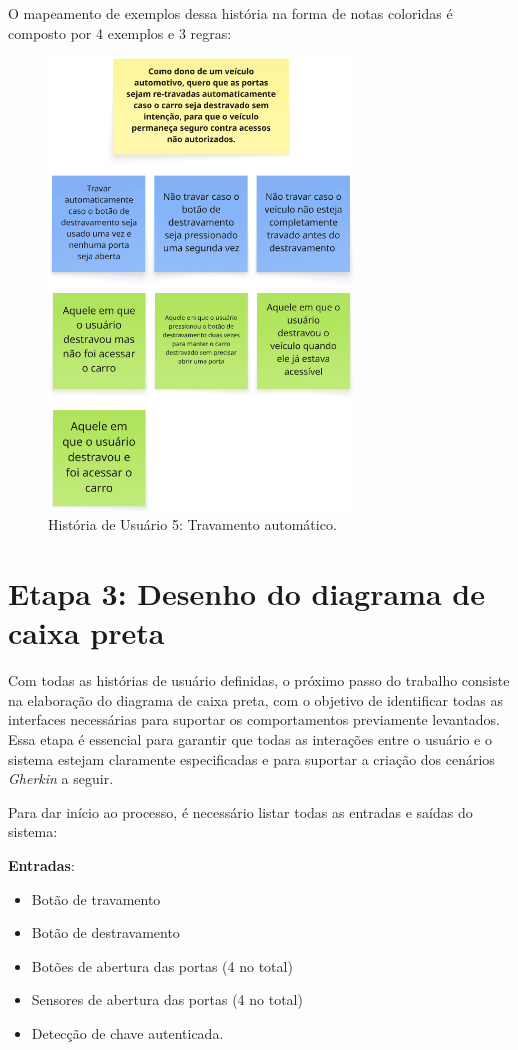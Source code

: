 O mapeamento de exemplos dessa história na forma de notas coloridas é composto por 4 exemplos e 3 regras:

\begin{figure}[H]
\centering
\includegraphics[height=12cm]{figuras/user_story_5.png}
\caption{História de Usuário 5: Travamento automático.}
\label{fig:historia5}
\end{figure}

\section{\textbf{Etapa 3: Desenho do diagrama de caixa preta}}
Com todas as histórias de usuário definidas, o próximo passo do trabalho consiste na elaboração do diagrama de caixa preta, com o objetivo de identificar todas as 
interfaces necessárias para suportar os comportamentos previamente levantados. Essa etapa é essencial para garantir que todas as interações entre o usuário e o 
sistema estejam claramente especificadas e para suportar a criação dos cenários \textit{Gherkin} a seguir.

Para dar início ao processo, é necessário listar todas as entradas e saídas do sistema:

\textbf{Entradas}:

\begin{itemize}
    \item Botão de travamento
    \item Botão de destravamento
    \item Botões de abertura das portas (4 no total)
    \item Sensores de abertura das portas (4 no total)
    \item Detecção de chave autenticada.
\end{itemize}

